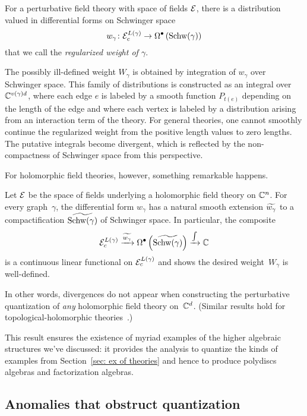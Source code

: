 \documentclass[11pt]{amsart}
\renewcommand{\op}{\operatorname}
\begin{document}
\begin{dfn}
For a perturbative field theory with space of fields $\mathcal E$, there is a distribution valued in differential forms on Schwinger space
\[
w_{\gamma} \colon \cE^{L(\gamma)}_c \to \Omega^\bu \left( \op{Schw}(\gamma) \right)
\]
that we call the {\em regularized weight of $\gamma$}.
\end{dfn}

The possibly ill-defined weight $W_\gamma$ is obtained by integration of $w_\gamma$ over Schwinger space.
This family of distributions is constructed as an integral over $\mathbb C^{v(\gamma) d}$,
where each edge $e$ is labeled by a smooth function $P_{t(e)}$ depending on the length of the edge and where each vertex is labeled by a distribution arising from an interaction term of the theory.
For general theories, one cannot smoothly continue the regularized weight from the positive length values to zero lengths.
The putative integrals become divergent, which is reflected by the non-compactness of Schwinger space from this perspective.

For holomorphic field theories, however, something remarkable happens.

\begin{thm}
Let $\mathcal E$ be the space of fields underlying a holomorphic field theory on ${\mathbb{C}}^n$.
For every graph~$\gamma$, the differential form $w_{\gamma}$ has a natural smooth extension $\widetilde {w_\gamma}$ to a compactification $\til{\op{Schw}(\gamma)}$ of Schwinger space.
In particular, the composite
\[
\cE^{L(\gamma)}_c \xto{\til{w_\gamma}}\Omega^\bu \left( \til{\op{Schw}(\gamma)} \right) \xto{\int} \C
\]
is a continuous linear functional on $\mathcal E_c^{L(\gamma)}$ and shows the desired weight~$W_\gamma$ is well-defined.
\end{thm}

In other words, divergences do not appear when constructing the perturbative quantization of {\em any} holomorphic field theory on~$\mathbb C^d$.
(Similar results hold for topological-holomorphic theories~\cite{WangWilliams}.)

This result ensures the existence of myriad examples of the higher algebraic structures we've discussed:
it provides the analysis to quantize the kinds of examples from Section~\ref{sec: ex of theories} and hence to produce polydiscs algebras and factorization algebras.

\subsection{Anomalies that obstruct quantization}
\end{document}

